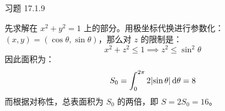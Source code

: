 \begin{problem}
	习题 17.1.9
	\begin{solution}
		先求解在 $x^2 + y^2 = 1$ 上的部分。用极坐标代换进行参数化：$(x, y) = (\cos \theta, \sin \theta)$，那么对 $z$ 的限制是：
		$$
		x^2 + z^2 \le 1 \implies z^2 \le \sin^2 \theta
		$$
		因此面积为：
		$$
		S_0 = \int_{0}^{2\pi} 2 \abs{\sin \theta} \dd{\theta} = 8
		$$
		而根据对称性，总表面积为 $S_0$ 的两倍，即 $S = 2 S_0 = 16$。
	\end{solution}
\end{problem}